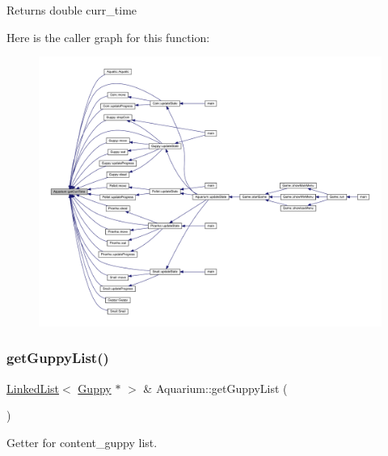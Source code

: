 \begin{DoxyReturn}{Returns}
double curr\+\_\+time 
\end{DoxyReturn}
Here is the caller graph for this function\+:
\nopagebreak
\begin{figure}[H]
\begin{center}
\leavevmode
\includegraphics[width=350pt]{class_aquarium_aae7158daf192a78ffaf165285386221f_icgraph}
\end{center}
\end{figure}
\mbox{\label{class_aquarium_a3244b33f404c2887f04342754f17f4ee}} 
\subsubsection{\texorpdfstring{get\+Guppy\+List()}{getGuppyList()}}
{\footnotesize\ttfamily \mbox{\hyperlink{class_linked_list}{Linked\+List}}$<$ \mbox{\hyperlink{class_guppy}{Guppy}} $\ast$ $>$ \& Aquarium\+::get\+Guppy\+List (\begin{DoxyParamCaption}{ }\end{DoxyParamCaption})}



Getter for content\+\_\+guppy list. 

